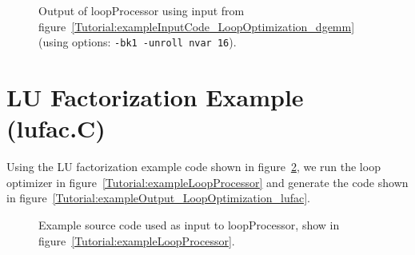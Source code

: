 \begin{figure}[!h]
{\indent
{\mySmallFontSize


\begin{latexonly}
   
\end{latexonly}

\begin{htmlonly}
   
\end{htmlonly}

}
}
\caption{Output of loopProcessor using input from figure~\ref{Tutorial:exampleInputCode_LoopOptimization_dgemm}
    (using options: {\tt -bk1 -unroll nvar 16}).}
\label{Tutorial:exampleOutput_LoopOptimization_dgemm}
\end{figure}



 \clearpage
\section{LU Factorization Example (lufac.C)}

   Using the LU factorization example code shown in 
figure~\ref{Tutorial:exampleInputCode_LoopOptimization_lufac}, we run the loop optimizer in
figure~\ref{Tutorial:exampleLoopProcessor} and generate the code shown in 
figure~\ref{Tutorial:exampleOutput_LoopOptimization_lufac}.

\begin{figure}[!h]
{\indent
{\mySmallFontSize


\begin{latexonly}
   
\end{latexonly}

\begin{htmlonly}
   
\end{htmlonly}

}
}
\caption{Example source code used as input to loopProcessor, show in figure~\ref{Tutorial:exampleLoopProcessor}.}
\label{Tutorial:exampleInputCode_LoopOptimization_lufac}
\end{figure}

